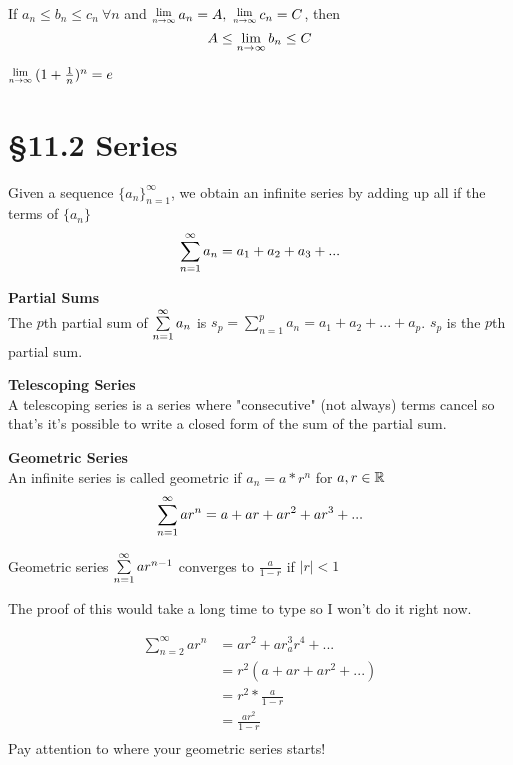 \documentclass[12 pt]{article}
\begin{document}
		If $a_n\leq b_n\leq c_n\ \forall n$ and $\Lim{n\toinfty}a_n=A,\ \Lim{n\toinfty}c_n=C$, then
		$$A\leq\lim_{n\rightarrow\infty}b_n\leq C$$
		\begin{remark}
			$\Lim{n\toinfty}(1+\frac{1}{n})^n=e$
		\end{remark}
	\section{\S 11.2 Series}
		Given a sequence $\{a_n\}_{n=1}^{\infty}$, we obtain an infinite series
		by adding up all if the terms of $\{a_n\}$
		$$\sum\limits_{n=1}^{\infty} a_n=a_1+a_2+a_3+...$$
		\begin{def*}\textbf{Partial Sums}\\
			The $p$th partial sum of $\sum\limits_{n=1}^{\infty} a_n$ is $s_p=\sum_{n=1}^p a_n=a_1+a_2+...+a_p$. $s_p$ is the $p$th partial sum.
		\end{def*}
		\begin{def*}\textbf{Telescoping Series}\\
			A telescoping series is a series where "consecutive" (not always) terms cancel so that's it's possible to write a closed form of the sum of the partial sum.
		\end{def*}
		\begin{def*}\textbf{Geometric Series}\\
			An infinite series is called geometric if $a_n=a*r^n$ for $a,r\in\mathbb{R}$
			$$\sum\limits_{n=1}^{\infty} ar^n=a+ar+ar^2+ar^3+...$$
		\end{def*}
		\begin{thrm}
			Geometric series $\sum\limits_{n=1}^{\infty} ar^{n-1}$ converges to $\frac{a}{1-r}$ if
			$\left|r\right|<1$
		\end{thrm}
		The proof of this would take a long time to type so I won't do it right now.
		\begin{exmp*}
			\begin{align*}
				\sum_{n=2}^{\infty}ar^n&=ar^2+ar^3_ar^4+...\\
				&=r^2(a+ar+ar^2+...)\\
				&=r^2*\frac{a}{1-r}\\
				&=\frac{ar^2}{1-r}\\
			\end{align*}
			Pay attention to where your geometric series starts!
		\end{exmp*}
\end{document}
